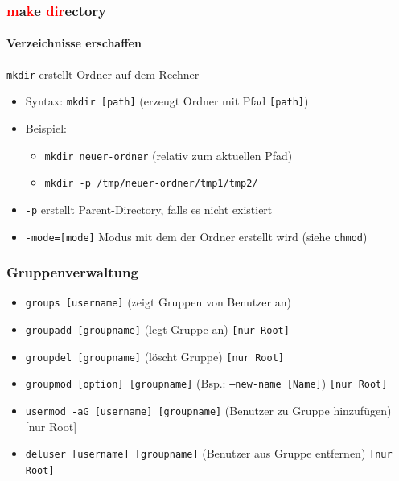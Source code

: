 \documentclass[12pt,utf8, handout]{beamer}
\begin{document}
\begin{frame}
\frametitle{\textcolor{red}{m}a\textcolor{red}{k}e \textcolor{red}{dir}ectory}
\framesubtitle{\textcolor{ownDarkOr}{Verzeichnisse erschaffen}}
\texttt{mkdir} erstellt Ordner auf dem Rechner
\begin{itemize}[<+->]
	\item Syntax: \texttt{mkdir [path]}   (erzeugt Ordner mit Pfad \texttt{[path]})
	\item Beispiel:
	\begin{itemize}[<+->]
		\item \texttt{mkdir neuer-ordner}    (relativ zum aktuellen Pfad)
		\item \texttt{mkdir -p /tmp/neuer-ordner/tmp1/tmp2/}
	\end{itemize}
	\item \texttt{-p}   erstellt Parent-Directory, falls es nicht existiert
	\item \texttt{-mode=[mode]}  Modus mit dem der Ordner erstellt wird (siehe \texttt{chmod})
\end{itemize}
\end{frame}

\begin{frame}
\frametitle{Gruppenverwaltung}
\begin{itemize}[<+->]
	\item \texttt{groups [username]} (zeigt Gruppen von Benutzer an)
	\item \texttt{groupadd [groupname]} (legt Gruppe an) \texttt{[nur Root]}
	\item \texttt{groupdel [groupname]} (löscht Gruppe) \texttt{[nur Root]}
	\item \texttt{groupmod [option] [groupname]} (Bsp.: \texttt{--new-name [Name]}) \texttt{[nur Root]}
	\item \texttt{usermod -aG [username] [groupname]} (Benutzer zu Gruppe hinzufügen) [nur Root]
	\item \texttt{deluser [username] [groupname]} (Benutzer aus Gruppe entfernen) \texttt{[nur Root]}
\end{itemize}
\end{frame}
\end{document}
